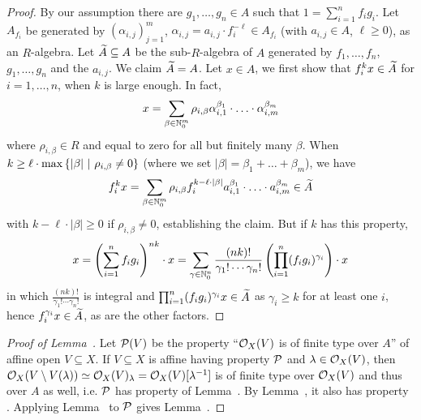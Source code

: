\documentclass[a4paper,parskip=half,numbers=enddot, DIV=12]{scrreprt}
\begin{document}
\begin{proof}
    By our assumption there are $g_1,\ldots,g_n\in A$ such that $1=\sum_{i=1}^n f_ig_i$. Let $A_{f_i}$ be generated by $(\alpha_{i,j})_{j=1}^m$, $\alpha_{i,j} = a_{i,j}\cdot f_i^{-\ell}\in A_{f_i}$ (with $a_{i,j}\in A$, $\ell\geq0$), as an $R$-algebra. Let $\snake A\subseteq A$ be the sub-$R$-algebra of $A$ generated by $f_1,\ldots,f_n$, $g_1,\ldots,g_n$ and the  $a_{i,j}$. We claim $\snake A = A$. Let $x\in A$, we first show that $f_i^kx \in \snake A$ for $i=1,\ldots, n$, when $k$ is large enough. In fact, 
    \begin{align*}
        x = \sum_{\beta \in \mathbb{N}_0^m} \rho_{i,\beta} \alpha_{i,1}^{\beta_1}\cdot\ldots\cdot \alpha_{i,m}^{\beta_m}
    \end{align*}
    where $\rho_{i,\beta}\in R$ and equal to zero for all but finitely many $\beta$. When $k\geq \ell\cdot \max\left\{|\beta|\ \middle|\  \rho_{i,\beta}\neq 0\right\}$ (where we set $|\beta|=\beta_1+\ldots+\beta_m$), we have
    \begin{align*}
        f_i^kx = \sum_{\beta \in \IN_0^m} \rho_{i,\beta}f_i^{k-\ell\cdot|\beta|} a_{i,1}^{\beta_1}\cdot\ldots\cdot a_{i,m}^{\beta_m}\in \snake A
    \end{align*}
    with $k-\ell\cdot|\beta|\geq 0$ if $\rho_{i,\beta}\neq 0$, establishing the claim. But if $k$ has this property,
    \begin{align*}
        x = \left(\sum_{i=1}^n f_ig_i\right)^{nk}\cdot x= \sum_{\gamma\in\mathbb{N}_0^n} \frac{(nk)!}{\gamma_1!\cdots\gamma_n!} \left(\prod_{i=1}^n (f_ig_i)^{\gamma_i}\right)\cdot x
    \end{align*}
    in which $\frac{(nk)!}{\gamma_1!\cdots\gamma_n!}$ is integral and $\prod_{i=1}^n (f_ig_i)^{\gamma_i}x\in \snake A$ as $\gamma_i\geq k$ for at least one $i$, hence $f_i^{\gamma_i}x\in\snake A$, as are the other factors.
\end{proof}

\begin{proof}[Proof of Lemma~]
    Let $\mathcal{P}(V)$ be the property ``$\mathcal{O}_X(V)$ is of finite type over $A$'' of affine open $V\subseteq X$. If $V\subseteq X$ is affine having property $\mathcal{P}$ and $\lambda\in\mathcal{O}_X(V)$, then $\mathcal{O}_X(V\setminus V(\lambda))\simeq\mathcal{O}_X(V)_\lambda=\mathcal{O}_X(V)[\lambda^{-1}]$ is of finite type over $\mathcal{O}_X(V)$ and thus over $A$ as well, i.e. $\mathcal{P}$ has property \itememph{\alpha} of Lemma~. By Lemma~, it also has property \itememph{\beta}. Applying Lemma~ to $\mathcal{P}$ gives Lemma~.
\end{proof}
\end{document}

